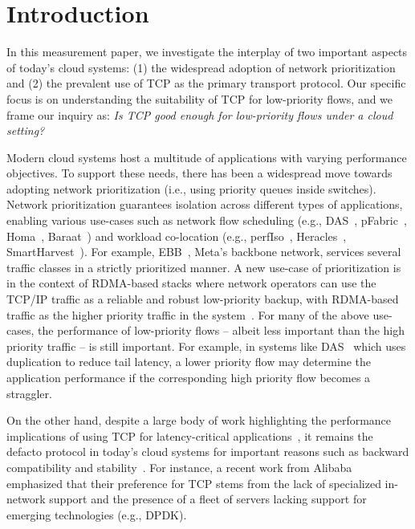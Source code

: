 \section{Introduction}
\label{sec:intro}

In this measurement paper, we investigate the interplay of two important aspects of today's cloud systems: (1) the widespread adoption of network prioritization and (2) the prevalent use of TCP as the primary transport protocol.
Our specific focus is on understanding the suitability of TCP for low-priority flows, and we frame our inquiry as: \textit{Is TCP good enough for low-priority flows under a cloud setting?}

Modern cloud systems host a multitude of applications with varying performance objectives.
To support these needs, there has been a widespread move towards adopting network prioritization (i.e., using priority queues inside switches). 
Network prioritization guarantees isolation across different types of applications, enabling various use-cases such as network flow scheduling (e.g., DAS~\cite{das}, pFabric~\cite{pfabric}, Homa~\cite{homa}, Baraat~\cite{baraat}) and workload co-location (e.g., perfIso~\cite{perfIso}, Heracles~\cite{heracles}, SmartHarvest~\cite{smart-harvest}).
For example, EBB~\cite{ebb}, Meta's backbone network, services several traffic classes in a strictly prioritized manner.
A new use-case of prioritization is in the context of RDMA-based stacks where network operators can use the TCP/IP traffic as a reliable and robust low-priority backup, with RDMA-based traffic as the higher priority traffic in the system~\cite{pangu}.
For many of the above use-cases, the performance of low-priority flows -- albeit less important than the high priority traffic -- is still important. 
For example, in systems like DAS~\cite{das} which uses duplication to reduce tail latency, a lower priority flow may determine the application performance if the corresponding high priority flow becomes a straggler. 

On the other hand, despite a large body of work highlighting the performance implications of using TCP for latency-critical applications~\cite{pdq,p3,pfabric,d2tcp,dctcp}, it remains the defacto protocol in today's cloud systems for important reasons such as backward compatibility and stability~\cite{morgan-stanley-nsdi15,accelnet,pangu,luna}. 
For instance, a recent work from Alibaba~\cite{luna} emphasized that their preference for TCP stems from the lack of specialized in-network support and the presence of a fleet of servers lacking support for emerging technologies (e.g., DPDK).

